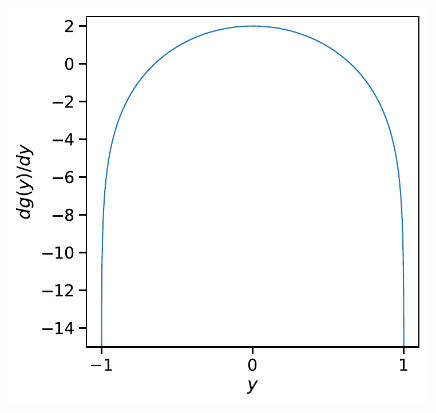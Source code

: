 \documentclass{article}
\theoremstyle{definition}
\theoremstyle{remark}
\begin{document}
\begin{figure}[H]
 \centering
 \includegraphics[width=0.99\textwidth]{figs/tanh_dydot.pdf}
 \caption{}
 \label{fig:tanh_dydot}
\end{figure}

% 
% 
\end{document}
